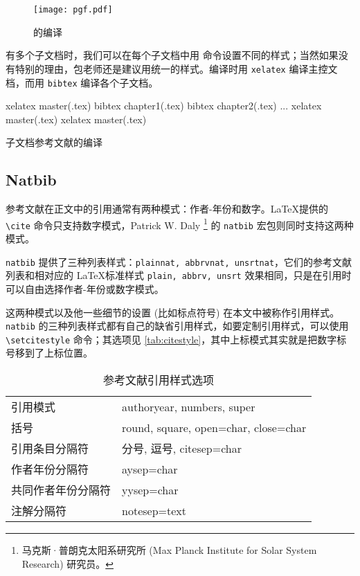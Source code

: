 \begin{figure}[htbp]
\centering
\texttt{[image: pgf.pdf]}
\caption{\BibTeX 的编译}
\label{fig:bibtex}
\end{figure}

有多个子文档时，我们可以在每个子文档中用 \verb|| 命令设置不同的样式；当然如果没有特别的理由，包老师还是建议用统一的样式。编译时用 \texttt{xelatex} 编译主控文档，而用 \texttt{bibtex} 编译各个子文档。

\begin{example}[htbp]
\begin{Code}[numbers=left]
xelatex master(.tex)
bibtex chapter1(.tex)
bibtex chapter2(.tex)
...
xelatex master(.tex)
xelatex master(.tex)
\end{Code}
\caption{子文档参考文献的编译}
\label{exa:subdoc_bibtex}
\end{example}

\subsection{Natbib}

参考文献在正文中的引用通常有两种模式：作者-年份和数字。\LaTeX 提供的 \verb|\cite| 命令只支持数字模式，Patrick W. Daly\indexDaly{} \footnote{马克斯·普朗克太阳系研究所 (Max Planck Institute for Solar System Research) 研究员。} 的 \texttt{natbib} 宏包\citep{Daly_natbib}则同时支持这两种模式。

\texttt{natbib} 提供了三种列表样式：\texttt{plainnat, abbrvnat, unsrtnat}，它们的参考文献列表和相对应的 \LaTeX 标准样式 \texttt{plain, abbrv, unsrt} 效果相同，只是在引用时可以自由选择作者-年份或数字模式。

这两种模式以及他一些细节的设置 (比如标点符号) 在本文中被称作引用样式。\texttt{natbib} 的三种列表样式都有自己的缺省引用样式，如要定制引用样式，可以使用 \verb|\setcitestyle| 命令；其选项见 \autoref{tab:citestyle}，其中上标模式其实就是把数字标号移到了上标位置。

\begin{table}[htbp]
\caption{参考文献引用样式选项}
\label{tab:citestyle}
\centering
\begin{tabular}{ll}
  \toprule
  引用模式            & authoryear, numbers, super \\
  括号                & round, square, open={char}, close={char} \\
  引用条目分隔符      & 分号, 逗号, citesep={char} \\
  作者年份分隔符      & aysep={char} \\
  共同作者年份分隔符  & yysep={char} \\
  注解分隔符          & notesep={text} \\
  \bottomrule
\end{tabular}
\end{table}

